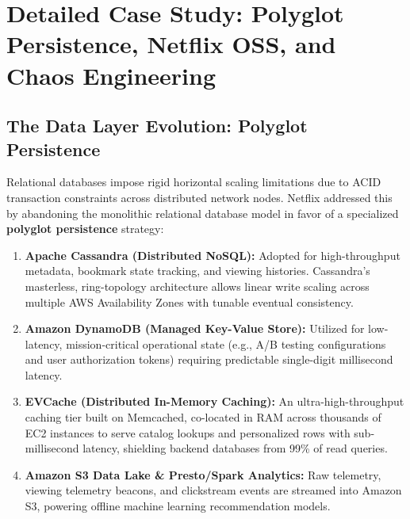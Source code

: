 \documentclass[11pt,a4paper]{article}
\begin{document}
\newpage

\section{Detailed Case Study: Polyglot Persistence, Netflix OSS, and Chaos Engineering}

\subsection{The Data Layer Evolution: Polyglot Persistence}
Relational databases impose rigid horizontal scaling limitations due to ACID transaction constraints across distributed network nodes. Netflix addressed this by abandoning the monolithic relational database model in favor of a specialized \textbf{polyglot persistence} strategy:
\begin{enumerate}[leftmargin=*]
    \item \textbf{Apache Cassandra (Distributed NoSQL):} Adopted for high-throughput metadata, bookmark state tracking, and viewing histories. Cassandra's masterless, ring-topology architecture allows linear write scaling across multiple AWS Availability Zones with tunable eventual consistency.
    \item \textbf{Amazon DynamoDB (Managed Key-Value Store):} Utilized for low-latency, mission-critical operational state (e.g., A/B testing configurations and user authorization tokens) requiring predictable single-digit millisecond latency.
    \item \textbf{EVCache (Distributed In-Memory Caching):} An ultra-high-throughput caching tier built on Memcached, co-located in RAM across thousands of EC2 instances to serve catalog lookups and personalized rows with sub-millisecond latency, shielding backend databases from 99\% of read queries.
    \item \textbf{Amazon S3 Data Lake \& Presto/Spark Analytics:} Raw telemetry, viewing telemetry beacons, and clickstream events are streamed into Amazon S3, powering offline machine learning recommendation models.
\end{enumerate}
\end{document}
